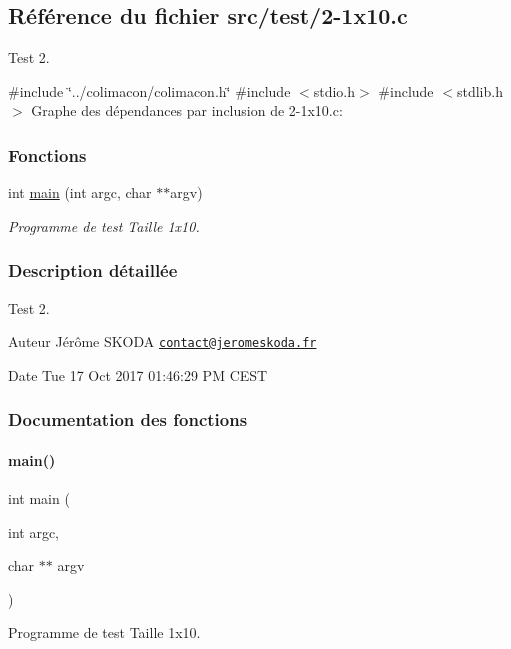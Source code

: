 \hypertarget{2-1x10_8c}{}\subsection{Référence du fichier src/test/2-\/1x10.c}
\label{2-1x10_8c}


Test 2.  


{\ttfamily \#include \char`\"{}../colimacon/colimacon.\+h\char`\"{}}\newline
{\ttfamily \#include $<$stdio.\+h$>$}\newline
{\ttfamily \#include $<$stdlib.\+h$>$}\newline
Graphe des dépendances par inclusion de 2-\/1x10.c\+:
\subsubsection*{Fonctions}
\begin{DoxyCompactItemize}
\item 
int \hyperlink{2-1x10_8c_a3c04138a5bfe5d72780bb7e82a18e627}{main} (int argc, char $\ast$$\ast$argv)
\begin{DoxyCompactList}\small\item\em Programme de test Taille 1x10. \end{DoxyCompactList}\end{DoxyCompactItemize}


\subsubsection{Description détaillée}
Test 2. 

\begin{DoxyAuthor}{Auteur}
Jérôme S\+K\+O\+DA \href{mailto:contact@jeromeskoda.fr}{\tt contact@jeromeskoda.\+fr} 
\end{DoxyAuthor}
\begin{DoxyDate}{Date}
Tue 17 Oct 2017 01\+:46\+:29 PM C\+E\+ST 
\end{DoxyDate}


\subsubsection{Documentation des fonctions}
\mbox{\label{2-1x10_8c_a3c04138a5bfe5d72780bb7e82a18e627}} 
\paragraph{\texorpdfstring{main()}{main()}}
{\footnotesize\ttfamily int main (\begin{DoxyParamCaption}\item[{int}]{argc,  }\item[{char $\ast$$\ast$}]{argv }\end{DoxyParamCaption})}



Programme de test Taille 1x10. 

